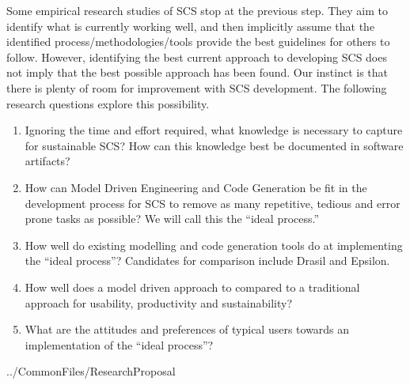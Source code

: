 \documentclass[12pt]{article}
\begin{document}
Some empirical research studies of SCS stop at the previous step.  They aim to
identify what is currently working well, and then implicitly assume that the
identified process/methodologies/tools provide the best guidelines for others to
follow.  However, identifying the best current approach to developing SCS does
not imply that the best possible approach has been found.  Our instinct is that
there is plenty of room for improvement with SCS development.  The following
research questions explore this possibility.

\begin{enumerate}
\item Ignoring the time and effort required, what knowledge is necessary to
  capture for sustainable SCS?  How can this knowledge best be documented in
  software artifacts?
\item How can Model Driven Engineering and Code Generation be fit in the
  development process for SCS to remove as many repetitive, tedious and error
  prone tasks as possible?  We will call this the ``ideal process.''
\item How well do existing modelling and code generation tools do at
  implementing the ``ideal process''?  Candidates for comparison include Drasil
  and Epsilon.
\item How well does a model driven approach to compared to a traditional
  approach for usability, productivity and sustainability?
\item What are the attitudes and preferences of typical users towards
  an implementation of the ``ideal process''?
\end{enumerate}


 {../CommonFiles/ResearchProposal}
\end{document}
